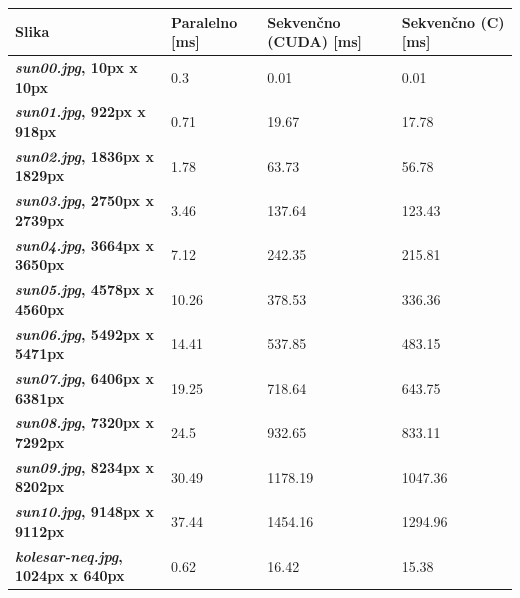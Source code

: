 \documentclass{article}
\begin{document}
\begin{center}
\begin{tabular}{|m{2.9cm}|m{2cm}|m{2.5cm}|m{2.5cm}|} 
 \hline
 \textbf{Slika} & \textbf{Paralelno [ms]} & \textbf{Sekvenčno (CUDA) [ms]} & \textbf{Sekvenčno (C) [ms]} \\ 
 \hline
 \textbf{\textit{sun00.jpg}, 10px x 10px} & 0.3 & 0.01 & 0.01 \\ 
 \hline
 \textbf{\textit{sun01.jpg}, 922px x 918px} & 0.71 & 19.67 & 17.78 \\ 
 \hline
 \textbf{\textit{sun02.jpg}, 1836px x 1829px} & 1.78 & 63.73 & 56.78 \\ 
 \hline
 \textbf{\textit{sun03.jpg}, 2750px x 2739px} & 3.46 & 137.64 & 123.43 \\ 
 \hline
 \textbf{\textit{sun04.jpg}, 3664px x 3650px} & 7.12 & 242.35 & 215.81 \\ 
 \hline
 \textbf{\textit{sun05.jpg}, 4578px x 4560px} & 10.26 & 378.53 & 336.36 \\ 
 \hline
 \textbf{\textit{sun06.jpg}, 5492px x 5471px} & 14.41 & 537.85 & 483.15 \\ 
 \hline
 \textbf{\textit{sun07.jpg}, 6406px x 6381px} & 19.25 & 718.64 & 643.75 \\ 
 \hline
 \textbf{\textit{sun08.jpg}, 7320px x 7292px} & 24.5 & 932.65 & 833.11 \\ 
 \hline
 \textbf{\textit{sun09.jpg}, 8234px x 8202px} & 30.49 & 1178.19 & 1047.36 \\ 
 \hline
 \textbf{\textit{sun10.jpg}, 9148px x 9112px} & 37.44 & 1454.16 & 1294.96 \\ 
 \hline
 \textbf{\textit{kolesar-neq.jpg}, 1024px x 640px} & 0.62 & 16.42 & 15.38 \\
 \hline
\end{tabular}
\end{center}
\end{document}
